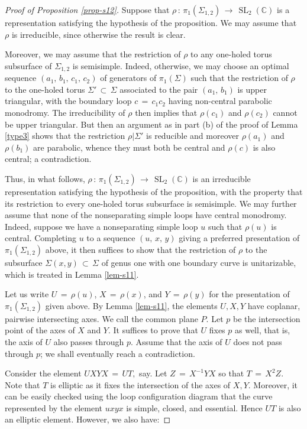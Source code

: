 \documentclass[reqno]{amsart}
\theoremstyle{plain}
\theoremstyle{definition}
\theoremstyle{remark}
\newcommand{\C}{{\mathbb{C}}}
\DeclareMathOperator{\SL}{SL}
\begin{document}
\begin{proof}[Proof of Proposition \ref{prop-s12}]
Suppose that $\rho\,:\, \pi_1(\Sigma_{1,2})\,\to\, \SL_2(\C)$ is a representation satisfying the hypothesis of the 
proposition. We may assume that $\rho$ is irreducible, since otherwise the result is clear.

Moreover, we may assume that the restriction of $\rho$ to any one-holed torus subsurface of $\Sigma_{1,2}$ is 
semisimple. Indeed, otherwise, we may choose an optimal sequence $(a_1,\,b_1,\,c_1,\,c_2)$ of generators of 
$\pi_1(\Sigma)$ such that the restriction of $\rho$ to the one-holed torus $\Sigma'\,\subset\,\Sigma$ associated to 
the pair $(a_1,\,b_1)$ is upper triangular, with the boundary loop $c\,=\,c_1c_2$ having non-central parabolic 
monodromy. The irreducibility of $\rho$ then implies that $\rho(c_1)$ and $\rho(c_2)$ cannot be upper 
triangular. But then an argument as in part (b) of the proof of Lemma \ref{type3} shows that the restriction 
$\rho|\Sigma'$ is reducible and moreover $\rho(a_1)$ and $\rho(b_1)$ are parabolic, whence they must both be 
central and $\rho(c)$ is also central; a contradiction.

Thus, in what follows, $\rho\,:\, \pi_1(\Sigma_{1,2}) \,\to\, \SL_2(\C)$ is an irreducible representation satisfying 
the hypothesis of the proposition, with the property that its restriction to every one-holed torus subsurface 
is semisimple. We may further assume that none of the nonseparating simple loops have central monodromy. 
Indeed, suppose we have a nonseparating simple loop $u$ such that $\rho(u)$ is central. Completing $u$ to a 
sequence $(u,\,x,\,y)$ giving a preferred presentation of $\pi_1(\Sigma_{1,2})$ above, it then suffices to show 
that the restriction of $\rho$ to the subsurface $\Sigma(x,y)\,\subset\,\Sigma $ of genus one with one boundary 
curve is unitarizable, which is treated in Lemma \ref{lem-s11}.

Let us write $U \,=\, \rho (u)$, $X\, =\, \rho (x)$, and $Y\, =\, \rho (y)$ for the presentation of 
$\pi_1(\Sigma_{1,2})$ given above. By Lemma \ref{lem-s11}, the elements $U, X, Y$ have coplanar, pairwise 
intersecting axes. We call the common plane $P$. Let $p$ be the intersection point of the axes of $X$ and $Y$. 
It suffices to prove that $U$ fixes $p$ as well, that is, the axis of $U$ also passes through $p$. Assume that 
the axis of $U$ does not pass through $p$; we shall eventually reach a contradiction.

Consider the element $ U XY X\,=\,UT,$ say. Let $Z\,=\,X^{-1} Y X$ so that $T\, =\, X^2 Z$. Note that $T$ is 
elliptic as it fixes the intersection of the axes of $X, Y$.  Moreover, it can be easily checked using the loop 
configuration diagram that the curve represented by the element $uxyx$ is simple, closed, and essential.  Hence 
$UT$ is also an elliptic element. However, we also have:


\end{proof}
\end{document}
